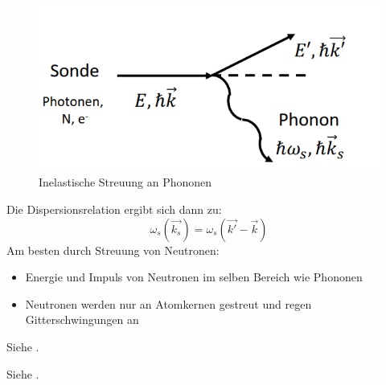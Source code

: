 \begin{figure}[H]
    \centering
    \includegraphics{resources/05-05-2015/Frage_17.png}
    \caption{Inelastische  Streuung an Phononen}
    \label{fig:enter-label}
\end{figure}
Die Dispersionsrelation ergibt sich dann zu:
\begin{equation}
    \omega_s(\vec{k_s})=\omega_s(\vec{k'}-\vec{k})
\end{equation}
Am besten durch Streuung von Neutronen: 
\begin{itemize}
    \item Energie und Impuls von Neutronen im selben Bereich wie Phononen
    \item Neutronen werden nur an Atomkernen gestreut und regen Gitterschwingungen an
\end{itemize}


\label{q:18}

Siehe .

\label{q:19}

Siehe .

\label{q:20}

\newpage
